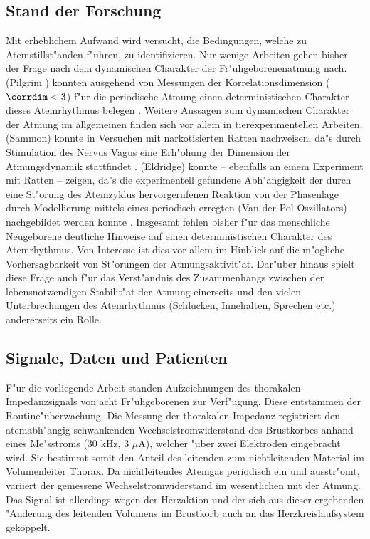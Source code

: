 \subsection{Stand der Forschung}

Mit erheblichem Aufwand wird versucht, die Bedingungen, welche zu Atemstillst"anden
f"uhren, zu identifizieren.  Nur wenige Arbeiten gehen bisher der Frage nach dem
dynamischen Charakter der Fr"uhgeborenenatmung nach. \autor(Pilgrim \etal) konnten
ausgehend von Messungen der Korrelationsdimension ($\corrdim<3$) f"ur die periodische
Atmung einen deterministischen Charakter dieses Atemrhythmus belegen \cite{Pilgram94}. Weitere Aussagen zum
dynamischen Charakter der Atmung im allgemeinen finden sich vor allem in
tierexperimentellen Arbeiten. \autor(Sammon) konnte in Versuchen mit narkotisierten Ratten
nachweisen, da"s durch Stimulation des Nervus Vagus eine Erh"ohung der Dimension der
Atmungsdynamik stattfindet \cite{Sammon91}.  \autor(Eldridge) konnte -- ebenfalls an einem
Experiment mit Ratten -- zeigen, da"s die experimentell gefundene Abh"angigkeit der durch
eine St"orung des Atemzyklus hervorgerufenen Reaktion von der Phasenlage durch
Modellierung mittels eines periodisch erregten \begriff(Van-der-Pol-Oszillators)
nachgebildet werden konnte \cite{Eldridge89}.  Insgesamt fehlen bisher f"ur das
menschliche Neugeborene deutliche Hinweise auf einen deterministischen Charakter des
Atemrhythmus. Von Interesse ist dies vor allem im Hinblick auf die m"ogliche
Vorhersagbarkeit von St"orungen der Atmungsaktivit"at.  Dar"uber hinaus spielt diese Frage auch f"ur das
Verst"andnis des Zusammenhangs zwischen der lebensnotwendigen Stabilit"at der Atmung
einerseits und den vielen Unterbrechungen des Atemrhythmus (Schlucken, Innehalten,
Sprechen etc.) andererseits ein Rolle.

\subsection{Signale, Daten und Patienten}

F"ur die vorliegende Arbeit standen Aufzeichnungen des thorakalen Impedanzsignals von acht
Fr"uhgeborenen zur Verf"ugung. Diese entstammen der Routine"uberwachung. Die Messung der
thorakalen Impedanz registriert den atemabh"angig schwankenden Wechselstromwiderstand des
Brustkorbes anhand eines Me"sstroms (30 kHz, 3 $\mu$A), welcher "uber zwei Elektroden
eingebracht wird. Sie bestimmt somit den Anteil des leitenden zum nichtleitenden Material
im Volumenleiter Thorax. Da nichtleitendes Atemgas periodisch ein und ausstr"omt, variiert
der gemessene Wechselstromwiderstand im wesentlichen mit der Atmung. Das Signal ist allerdings
wegen der Herzaktion und der sich aus dieser ergebenden "Anderung des leitenden Volumens
im Brustkorb auch an das Herzkreislaufsystem gekoppelt. 

